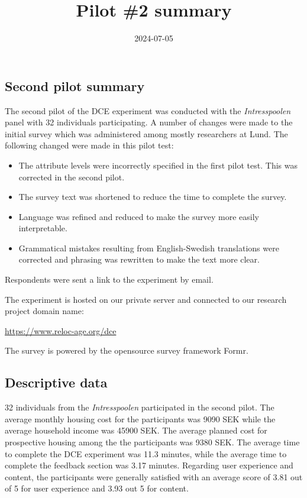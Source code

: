 \documentclass[
]{article}
\title{Pilot \#2 summary}
\author{}
\date{\vspace{-2.5em}2024-07-05}
\providecommand{\tightlist}{%
  \setlength{\itemsep}{0pt}\setlength{\parskip}{0pt}}
\begin{document}
\maketitle

\hypertarget{second-pilot-summary}{%
\subsection{Second pilot summary}\label{second-pilot-summary}}

The second pilot of the DCE experiment was conducted with the
\emph{Intresspoolen} panel with 32 individuals participating. A number
of changes were made to the initial survey which was administered among
mostly researchers at Lund. The following changed were made in this
pilot test:

\begin{itemize}
\tightlist
\item
  The attribute levels were incorrectly specified in the first pilot
  test. This was corrected in the second pilot.
\item
  The survey text was shortened to reduce the time to complete the
  survey.
\item
  Language was refined and reduced to make the survey more easily
  interpretable.
\item
  Grammatical mistakes resulting from English-Swedish translations were
  corrected and phrasing was rewritten to make the text more clear.
\end{itemize}

Respondents were sent a link to the experiment by email.

The experiment is hosted on our private server and connected to our
research project domain name:

\url{https://www.reloc-age.org/dce}

The survey is powered by the opensource survey framework Formr.

\hypertarget{descriptive-data}{%
\subsection{Descriptive data}\label{descriptive-data}}

32 individuals from the \emph{Intresspoolen} participated in the second
pilot. The average monthly housing cost for the participants was 9090
SEK while the average household income was 45900 SEK. The average
planned cost for prospective housing among the the participants was 9380
SEK. The average time to complete the DCE experiment was 11.3 minutes,
while the average time to complete the feedback section was 3.17
minutes. Regarding user experience and content, the participants were
generally satisfied with an average score of 3.81 out of 5 for user
experience and 3.93 out 5 for content.
\end{document}
